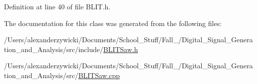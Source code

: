 Definition at line 40 of file B\-L\-I\-T.\-h.



The documentation for this class was generated from the following files\-:\begin{DoxyCompactItemize}
\item 
/\-Users/alexanderzywicki/\-Documents/\-School\-\_\-\-Stuff/\-Fall\-\_/\-Digital\-\_\-\-Signal\-\_\-\-Generation\-\_\-and\-\_\-\-Analysis/src/include/\hyperlink{BLITSaw_8h}{B\-L\-I\-T\-Saw.\-h}\item 
/\-Users/alexanderzywicki/\-Documents/\-School\-\_\-\-Stuff/\-Fall\-\_/\-Digital\-\_\-\-Signal\-\_\-\-Generation\-\_\-and\-\_\-\-Analysis/src/\hyperlink{BLITSaw_8cpp}{B\-L\-I\-T\-Saw.\-cpp}\end{DoxyCompactItemize}
